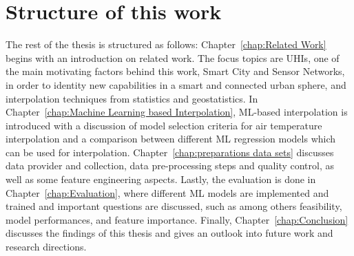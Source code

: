 \section{Structure of this work}

The rest of the thesis is structured as follows: Chapter~\ref{chap:Related Work} begins with an introduction on related work. The focus topics are UHIs, one of the main motivating factors behind this work, Smart City and Sensor Networks, in order to identity new capabilities in a smart and connected urban sphere, and interpolation techniques from statistics and geostatistics. In Chapter~\ref{chap:Machine Learning based Interpolation}, ML-based interpolation is introduced with a discussion of model selection criteria for air temperature interpolation and a comparison between different ML regression models which can be used for interpolation. Chapter~\ref{chap:preparations data sets} discusses data provider and collection, data pre-processing steps and quality control, as well as some feature engineering aspects. Lastly, the evaluation is done in Chapter~\ref{chap:Evaluation}, where different ML models are implemented and trained and important questions are discussed, such as among others feasibility, model performances, and feature importance. Finally, Chapter~\ref{chap:Conclusion} discusses the findings of this thesis and gives an outlook into future work and research directions.
